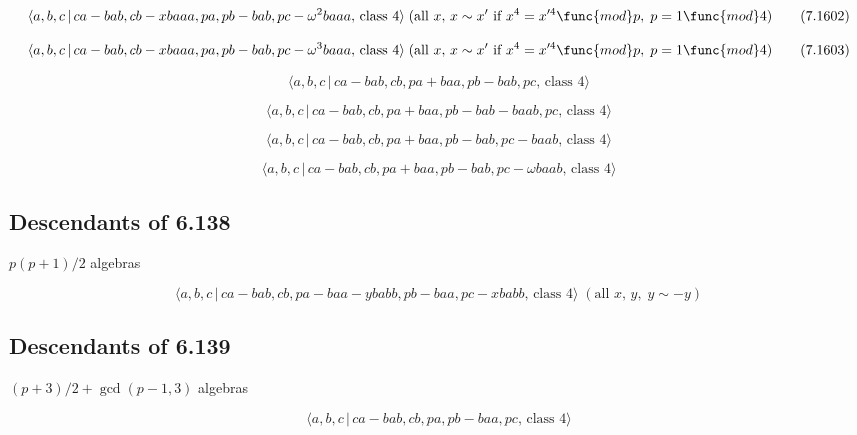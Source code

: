 \documentclass[10pt]{article}
\begin{document}
\begin{equation}
\langle a,b,c\,|\,ca-bab,cb-xbaaa,pa,pb-bab,pc-\omega ^{2}baaa,\,\text{class 
}4\rangle \;(\text{all }x,\,x\sim x^{\prime}\text{ if }x^4=x^{\prime 4}\func{%
mod}p,\;p=1\func{mod}4)  \tag{7.1602}
\end{equation}

\begin{equation}
\langle a,b,c\,|\,ca-bab,cb-xbaaa,pa,pb-bab,pc-\omega ^{3}baaa,\,\text{class 
}4\rangle \;(\text{all }x,\,x\sim x^{\prime}\text{ if }x^4=x^{\prime 4}\func{%
mod}p,\;p=1\func{mod}4)  \tag{7.1603}
\end{equation}

\begin{equation}
\langle a,b,c\,|\,ca-bab,cb,pa+baa,pb-bab,pc,\,\text{class }4\rangle 
\tag{7.1604}
\end{equation}

\begin{equation}
\langle a,b,c\,|\,ca-bab,cb,pa+baa,pb-bab-baab,pc,\,\text{class }4\rangle 
\tag{7.1605}
\end{equation}

\begin{equation}
\langle a,b,c\,|\,ca-bab,cb,pa+baa,pb-bab,pc-baab,\,\text{class }4\rangle 
\tag{7.1606}
\end{equation}

\begin{equation}
\langle a,b,c\,|\,ca-bab,cb,pa+baa,pb-bab,pc-\omega baab,\,\text{class }%
4\rangle  \tag{7.1607}
\end{equation}

\subsection{Descendants of 6.138}

$p(p+1)/2$ algebras

\begin{equation}
\langle a,b,c\,|\,ca-bab,cb,pa-baa-ybabb,pb-baa,pc-xbabb,\,\text{class }%
4\rangle \;(\text{all }x,\,y,\;y\sim -y)  \tag{7.1608}
\end{equation}

\subsection{Descendants of 6.139}

$(p+3)/2+\gcd (p-1,3)$ algebras

\begin{equation}
\langle a,b,c\,|\,ca-bab,cb,pa,pb-baa,pc,\,\text{class }4\rangle 
\tag{7.1609}
\end{equation}
\end{document}
